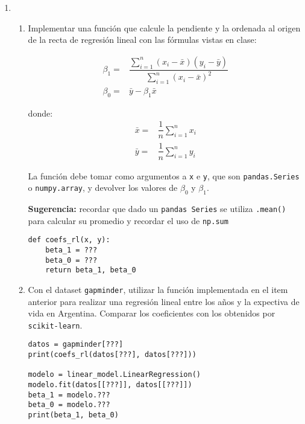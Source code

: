 \documentclass[a4paper,11pt]{article}
\theoremstyle{definition}
\begin{document}
\begin{enumerate}[resume]
\item 
\begin{enumerate}
    \item Implementar una función que calcule la pendiente y la ordenada al origen de la recta de regresión lineal con las fórmulas vistas en clase:

     \[
     \begin{array}{rl}
          {\beta}_1 = & \dfrac{\displaystyle\sum_{i=1}^n(x_i - \bar{x})(y_i - \bar{y})}{\displaystyle\sum_{i=1}^n(x_i - \bar{x})^2}  \\[1em]
          {\beta}_0 = & \bar{y} - \beta_1\bar{x}
     \end{array}
     \]

          donde:
     \[
     \begin{array}{rl}
          \bar{x} =& \dfrac{1}{n} \displaystyle\sum_{i=1}^n x_i  \\
          \bar{y} =& \dfrac{1}{n} \displaystyle\sum_{i=1}^n y_i
     \end{array}
     \]


    La función debe tomar como argumentos a \texttt{x} e \texttt{y}, que son \verb|pandas.Series| o \verb|numpy.array|, y devolver los valores de $\beta_0$ y $\beta_1$. 
    
    \textbf{Sugerencia:} recordar que dado un \texttt{pandas Series} se utiliza \texttt{.mean()} para calcular su promedio y recordar el uso de \texttt{np.sum}
    \vspace{0.2cm} 
\begin{lstlisting}
def coefs_rl(x, y):
    beta_1 = ???
    beta_0 = ???
    return beta_1, beta_0
\end{lstlisting}
    \item Con el dataset \texttt{gapminder}, utilizar la función implementada en el item anterior para realizar una regresión lineal entre los años y la expectiva de vida en Argentina. Comparar los coeficientes con los obtenidos por \texttt{scikit-learn}.
    \vspace{0.2cm} 
    
\begin{lstlisting}
datos = gapminder[???]
print(coefs_rl(datos[???], datos[???]))

modelo = linear_model.LinearRegression()
modelo.fit(datos[[???]], datos[[???]])
beta_1 = modelo.???
beta_0 = modelo.???
print(beta_1, beta_0)
\end{lstlisting}
\end{enumerate}


\end{enumerate}
\end{document}
